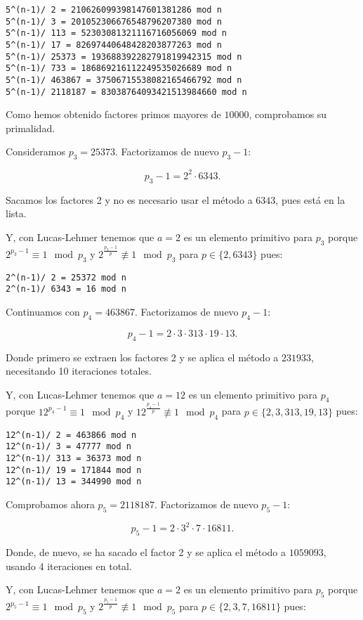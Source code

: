 \documentclass[a4paper]{article}
\begin{document}
\begin{verbatim}
5^(n-1)/ 2 = 210626099398147601381286 mod n
5^(n-1)/ 3 = 201052306676548796207380 mod n
5^(n-1)/ 113 = 52303081321116716056069 mod n
5^(n-1)/ 17 = 82697440648428203877263 mod n
5^(n-1)/ 25373 = 193688392282791819942315 mod n
5^(n-1)/ 733 = 186869216112249535026689 mod n
5^(n-1)/ 463867 = 37506715538082165466792 mod n
5^(n-1)/ 2118187 = 83038764093421513984660 mod n
\end{verbatim}

Como hemos obtenido factores primos mayores de $10000$, comprobamos su primalidad.

Consideramos $p_3=25373$. Factorizamos de nuevo $p_3-1$:

$$p_3-1=2^2\cdot 6343.$$

Sacamos los factores 2 y no es necesario usar el método a $6343$, pues está en la lista.

Y, con Lucas-Lehmer tenemos que $a=2$ es un elemento primitivo para $p_3$ porque $2^{p_3-1}\equiv 1\mod p_3$ y $2^{\frac{p_3-1}{p}}\not\equiv 1\mod p_3 $ para $p\in\{2, 6343\}$ pues:

\begin{verbatim}
2^(n-1)/ 2 = 25372 mod n
2^(n-1)/ 6343 = 16 mod n
\end{verbatim}

Continuamos con $p_4=463867$. Factorizamos de nuevo $p_4-1$:

$$p_4-1=2\cdot 3\cdot 313 \cdot 19\cdot 13.$$

Donde primero se extraen los factores 2 y se aplica el método a $231933$, necesitando 10 iteraciones totales.

Y, con Lucas-Lehmer tenemos que $a=12$ es un elemento primitivo para $p_4$ porque $12^{p_4-1}\equiv 1\mod p_4$ y $12^{\frac{p_4-1}{p}}\not\equiv 1\mod p_4 $ para $p\in\{2, 3, 313, 19, 13\}$ pues:

\begin{verbatim}
12^(n-1)/ 2 = 463866 mod n
12^(n-1)/ 3 = 47777 mod n
12^(n-1)/ 313 = 36373 mod n
12^(n-1)/ 19 = 171844 mod n
12^(n-1)/ 13 = 344990 mod n
\end{verbatim}

Comprobamos ahora $p_5=2118187$. Factorizamos de nuevo $p_5-1$:

$$p_5-1=2\cdot 3^2\cdot 7 \cdot 16811.$$

Donde, de nuevo, se ha sacado el factor 2 y se aplica el método a $1059093$, usando 4 iteraciones en total.

Y, con Lucas-Lehmer tenemos que $a=2$ es un elemento primitivo para $p_5$ porque $2^{p_5-1}\equiv 1\mod p_5$ y $2^{\frac{p_5-1}{p}}\not\equiv 1\mod p_5 $ para $p\in\{2, 3, 7, 16811\}$ pues:
\end{document}
